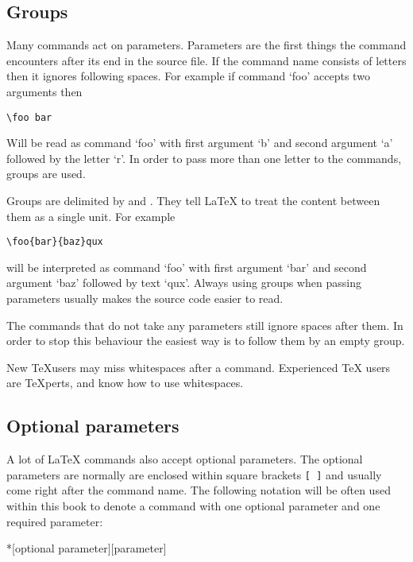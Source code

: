 \subsection{Groups}

Many commands act on parameters. Parameters are the first things the command
encounters after its end in the source file. If the command name consists of
letters then it ignores following spaces. For example if command \enquote*{foo}
accepts two arguments then
\begin{code}
  \verb+\foo bar+
\end{code}
Will be read as command \enquote*{foo} with first argument \enquote*{b} and
second argument \enquote*{a} followed by the letter \enquote*{r}. In order to pass
more than one letter to the commands, groups are used.

Groups are delimited by \ai{\{} and \ai{\}}. They tell \LaTeX{} to treat the
content between them as a single unit. For example
\begin{code}
  \verb+\foo{bar}{baz}qux+
\end{code}
will be interpreted as command \enquote*{foo} with first argument
\enquote*{bar} and second argument \enquote*{baz} followed by text
\enquote*{qux}. Always using groups when passing parameters usually makes the
source code easier to read.

The commands that do not take any parameters still ignore spaces after them. In
order to stop this behaviour the easiest way is to follow them by an empty
group.

\begin{chktexignore}
  \begin{example}
New \TeX users may miss whitespaces
after a command. %
Experienced \TeX{} users are
\TeX perts, and know how to use
whitespaces. %
\end{example}
\end{chktexignore}

\subsection{Optional parameters}

A lot of \LaTeX{} commands also accept optional parameters. The optional parameters are normally are enclosed
within square brackets \verb|[ ]| and usually come right after the command
name. The following notation will be often used within this book to denote a
command with one optional parameter and one required parameter:
\begin{lscommand}
  *[optional parameter][parameter]
\end{lscommand}


